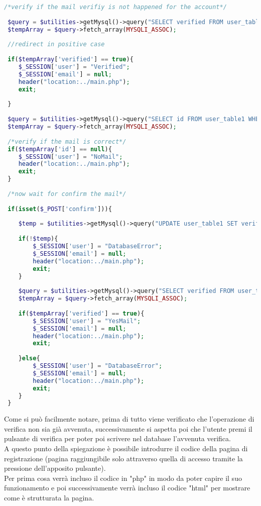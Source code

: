  \begin{lstlisting}[language=php]
 /*verify if the mail verifiy is not happened for the account*/
 
 $query = $utilities->getMysql()->query("SELECT verified FROM user_table1 WHERE (email = '{$_SESSION['email']}')");
 $tempArray = $query->fetch_array(MYSQLI_ASSOC);
 
 //redirect in positive case
 
 if($tempArray['verified'] == true){
 	$_SESSION['user'] = "Verified";
 	$_SESSION['email'] = null;
 	header("location:../main.php");
 	exit;
 	
 }
 
 $query = $utilities->getMysql()->query("SELECT id FROM user_table1 WHERE (email = '{$_SESSION['email']}')");
 $tempArray = $query->fetch_array(MYSQLI_ASSOC);
 
 /*verify if the mail is correct*/
 if($tempArray['id'] == null){
 	$_SESSION['user'] = "NoMail";
 	header("location:../main.php");
 	exit;
 }
 
 /*now wait for confirm the mail*/
 
 if(isset($_POST['confirm'])){
 	
 	$temp = $utilities->getMysql()->query("UPDATE user_table1 SET verified = 1 WHERE (id = '{$tempArray['id']}')");
 	
 	if(!$temp){
 		$_SESSION['user'] = "DatabaseError";
 		$_SESSION['email'] = null;
 		header("location:../main.php");
 		exit;
 	}
 	
 	$query = $utilities->getMysql()->query("SELECT verified FROM user_table1 WHERE (email = '{$_SESSION['email']}')");
 	$tempArray = $query->fetch_array(MYSQLI_ASSOC);
 	
 	if($tempArray['verified'] == true){
 		$_SESSION['user'] = "YesMail";
 		$_SESSION['email'] = null;
 		header("location:../main.php");
 		exit;
 		
 	}else{
 		$_SESSION['user'] = "DatabaseError";
 		$_SESSION['email'] = null;
 		header("location:../main.php");
 		exit;
 	}
 }
 \end{lstlisting}
 
 Come si può facilmente notare, prima di tutto viene verificato che l'operazione di verifica non sia già avvenuta, successivamente si aspetta poi che l'utente premi il pulsante di verifica per poter poi scrivere nel database l'avvenuta verifica.\\
 
 A questo punto della spiegazione è possibile introdurre il codice della pagina di registrazione (pagina raggiungibile solo attraverso quella di accesso tramite la pressione dell'apposito pulsante).\\
 Per prima cosa verrà incluso il codice in "php" in modo da poter capire il suo funzionamento e poi successivamente verrà incluso il codice "html" per mostrare come è strutturata la pagina.\\
 

